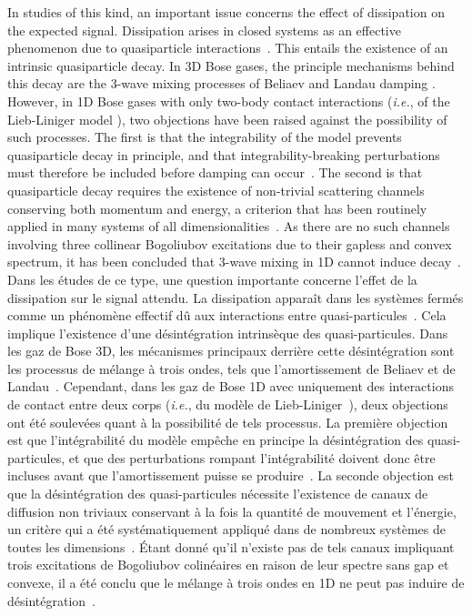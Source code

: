 \documentclass[aps,prd,notitlepage,amsfonts,amssymb,amsmath,nofootinbib,superscriptaddress,longbibliography]{revtex4-2}
\newcommand{\trad}[1]{\textcolor{tradcolor}{#1}}
\begin{document}
In studies of this kind, an important issue concerns the effect of dissipation on the expected signal.  
Dissipation arises in closed systems as an effective phenomenon due to quasiparticle interactions~\cite{Pylak-Zin-2018,Robertson_2018}.  This entails the existence of an intrinsic quasiparticle decay.
In 3D Bose gases, the principle mechanisms behind this decay 
are the 3-wave mixing processes of Beliaev and Landau damping \cite{Pitaevskii_1997,Fedichev_1998}.
However, in 1D Bose gases with only two-body contact interactions ({\it i.e.}, of the Lieb-Liniger model \cite{Lieb1963}), two objections have been raised against the possibility of such processes.
The first is that the 
integrability of the model prevents quasiparticle decay in principle, and that integrability-breaking perturbations must therefore be included before damping can occur~\cite{Tan2010,Ristivojevic2016,imambekov_one-dimensional_2012}.
The second is that quasiparticle decay requires the existence of non-trivial scattering channels conserving both momentum and energy, a criterion that has been routinely applied in many systems of all dimensionalities~\cite{Maris-1977,Tsuchiya-Griffin-2004,Natu-DasSarma-2013,Van_Regemortel_2017,Kurkjian-Ristivojevic-2020}.
As there are no such channels involving three collinear Bogoliubov excitations due to their gapless and convex spectrum, it has been concluded that 3-wave mixing in 1D cannot induce decay~\cite{Tan2010,Ristivojevic_2014, Van_Regemortel_2017}.
\trad{
Dans les études de ce type, une question importante concerne l'effet de la dissipation sur le signal attendu. La dissipation apparaît dans les systèmes fermés comme un phénomène effectif dû aux interactions entre quasi-particules~\cite{Pylak-Zin-2018,Robertson_2018}. Cela implique l'existence d'une désintégration intrinsèque des quasi-particules.
Dans les gaz de Bose 3D, les mécanismes principaux derrière cette désintégration sont les processus de mélange à trois ondes, tels que l'amortissement de Beliaev et de Landau~\cite{Pitaevskii_1997,Fedichev_1998}. Cependant, dans les gaz de Bose 1D avec uniquement des interactions de contact entre deux corps ({\it i.e.}, du modèle de Lieb-Liniger~\cite{Lieb1963}), deux objections ont été soulevées quant à la possibilité de tels processus.
La première objection est que l'intégrabilité du modèle empêche en principe la désintégration des quasi-particules, et que des perturbations rompant l'intégrabilité doivent donc être incluses avant que l'amortissement puisse se produire~\cite{Tan2010,Ristivojevic2016,imambekov_one-dimensional_2012}. 
La seconde objection est que la désintégration des quasi-particules nécessite l'existence de canaux de diffusion non triviaux conservant à la fois la quantité de mouvement et l'énergie, un critère qui a été systématiquement appliqué dans de nombreux systèmes de toutes les dimensions~\cite{Maris-1977,Tsuchiya-Griffin-2004,Natu-DasSarma-2013,Van_Regemortel_2017,Kurkjian-Ristivojevic-2020}. Étant donné qu'il n'existe pas de tels canaux impliquant trois excitations de Bogoliubov colinéaires en raison de leur spectre sans gap et convexe, il a été conclu que le mélange à trois ondes en 1D ne peut pas induire de désintégration~\cite{Tan2010,Ristivojevic_2014, Van_Regemortel_2017}.
}
\end{document}
